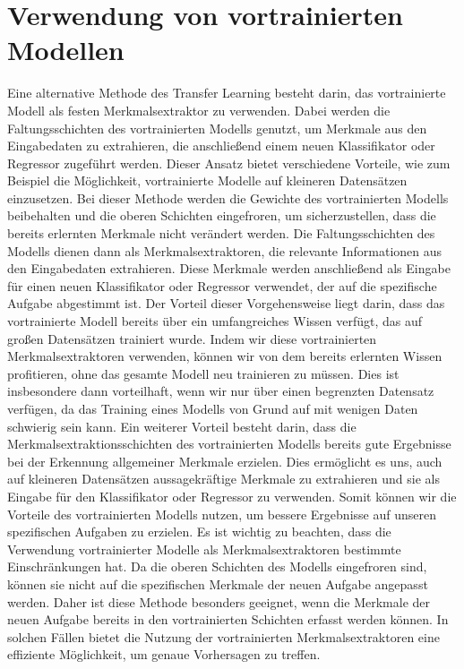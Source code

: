 \section{Verwendung von vortrainierten Modellen}

    Eine alternative Methode des Transfer Learning besteht darin, das vortrainierte Modell als festen Merkmalsextraktor zu verwenden. 
    Dabei werden die Faltungsschichten des vortrainierten Modells genutzt, um Merkmale aus den Eingabedaten zu extrahieren, die anschließend einem neuen Klassifikator oder Regressor zugeführt werden. 
    Dieser Ansatz bietet verschiedene Vorteile, wie zum Beispiel die Möglichkeit, vortrainierte Modelle auf kleineren Datensätzen einzusetzen.
    Bei dieser Methode werden die Gewichte des vortrainierten Modells beibehalten und die oberen Schichten eingefroren, um sicherzustellen, dass die bereits erlernten Merkmale nicht verändert werden. 
    Die Faltungsschichten des Modells dienen dann als Merkmalsextraktoren, die relevante Informationen aus den Eingabedaten extrahieren. 
    Diese Merkmale werden anschließend als Eingabe für einen neuen Klassifikator oder Regressor verwendet, der auf die spezifische Aufgabe abgestimmt ist.
    Der Vorteil dieser Vorgehensweise liegt darin, dass das vortrainierte Modell bereits über ein umfangreiches Wissen verfügt, das auf großen Datensätzen trainiert wurde. 
    Indem wir diese vortrainierten Merkmalsextraktoren verwenden, können wir von dem bereits erlernten Wissen profitieren, ohne das gesamte Modell neu trainieren zu müssen. 
    Dies ist insbesondere dann vorteilhaft, wenn wir nur über einen begrenzten Datensatz verfügen, da das Training eines Modells von Grund auf mit wenigen Daten schwierig sein kann.
    Ein weiterer Vorteil besteht darin, dass die Merkmalsextraktionsschichten des vortrainierten Modells bereits gute Ergebnisse bei der Erkennung allgemeiner Merkmale erzielen. 
    Dies ermöglicht es uns, auch auf kleineren Datensätzen aussagekräftige Merkmale zu extrahieren und sie als Eingabe für den Klassifikator oder Regressor zu verwenden. 
    Somit können wir die Vorteile des vortrainierten Modells nutzen, um bessere Ergebnisse auf unseren spezifischen Aufgaben zu erzielen.
    Es ist wichtig zu beachten, dass die Verwendung vortrainierter Modelle als Merkmalsextraktoren bestimmte Einschränkungen hat. 
    Da die oberen Schichten des Modells eingefroren sind, können sie nicht auf die spezifischen Merkmale der neuen Aufgabe angepasst werden. 
    Daher ist diese Methode besonders geeignet, wenn die Merkmale der neuen Aufgabe bereits in den vortrainierten Schichten erfasst werden können. 
    In solchen Fällen bietet die Nutzung der vortrainierten Merkmalsextraktoren eine effiziente Möglichkeit, um genaue Vorhersagen zu treffen.

